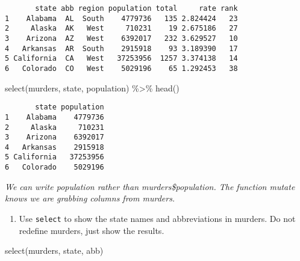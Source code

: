 \documentclass[
  letterpaper,
  DIV=11,
  numbers=noendperiod]{scrreprt}
\newenvironment{Shaded}{\begin{snugshade}}{\end{snugshade}}
\newcommand{\FunctionTok}[1]{\textcolor[rgb]{0.28,0.35,0.67}{#1}}
\newcommand{\NormalTok}[1]{\textcolor[rgb]{0.00,0.23,0.31}{#1}}
\newcommand{\SpecialCharTok}[1]{\textcolor[rgb]{0.37,0.37,0.37}{#1}}
\providecommand{\tightlist}{%
  \setlength{\itemsep}{0pt}\setlength{\parskip}{0pt}}
\begin{document}
\begin{verbatim}
       state abb region population total     rate rank
1    Alabama  AL  South    4779736   135 2.824424   23
2     Alaska  AK   West     710231    19 2.675186   27
3    Arizona  AZ   West    6392017   232 3.629527   10
4   Arkansas  AR  South    2915918    93 3.189390   17
5 California  CA   West   37253956  1257 3.374138   14
6   Colorado  CO   West    5029196    65 1.292453   38
\end{verbatim}

\begin{Shaded}
\begin{Highlighting}[]
\FunctionTok{select}\NormalTok{(murders, state, population) }\SpecialCharTok{\%\textgreater{}\%} \FunctionTok{head}\NormalTok{()}
\end{Highlighting}
\end{Shaded}

\begin{verbatim}
       state population
1    Alabama    4779736
2     Alaska     710231
3    Arizona    6392017
4   Arkansas    2915918
5 California   37253956
6   Colorado    5029196
\end{verbatim}

\emph{We can write population rather than murders\$population. The
function mutate knows we are grabbing columns from murders.}

\begin{enumerate}
\def\labelenumi{\arabic{enumi}.}
\setcounter{enumi}{2}
\tightlist
\item
  Use \texttt{select} to show the state names and abbreviations in
  murders. Do not redefine murders, just show the results.
\end{enumerate}

\begin{Shaded}
\begin{Highlighting}[]
\FunctionTok{select}\NormalTok{(murders, state, abb)}
\end{Highlighting}
\end{Shaded}
\end{document}
